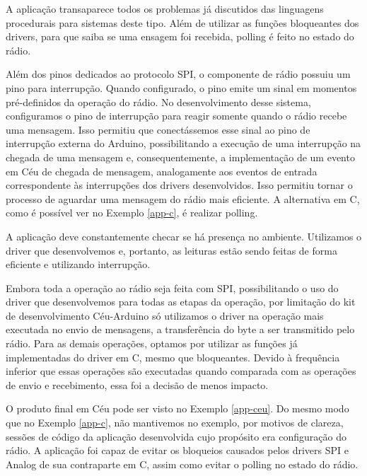\documentclass[11pt]{article}
\begin{document}
\par A aplicação transaparece todos os problemas já discutidos das linguagens procedurais para sistemas deste tipo. Além de utilizar as funções bloqueantes dos drivers, para que saiba se uma ensagem foi recebida, polling é feito no estado do rádio.
\par Além dos pinos dedicados ao protocolo SPI, o componente de rádio possuiu um pino para interrupção. Quando configurado, o pino emite um sinal em momentos pré-definidos da operação do rádio. No desenvolvimento desse sistema, configuramos o pino de interrupção para reagir somente quando o rádio recebe uma mensagem. Isso permitiu que conectássemos esse sinal ao pino de interrupção externa do Arduino, possibilitando a execução de uma interrupção na chegada de uma mensagem e, consequentemente, a implementação de um evento em Céu de chegada de mensagem, analogamente aos eventos de entrada correspondente às interrupções dos drivers desenvolvidos. Isso permitiu tornar o processo de aguardar uma mensagem do rádio mais eficiente. A alternativa em C, como é possível ver no Exemplo \ref{app-c}, é realizar polling.
\par A aplicação deve constantemente checar se há presença no ambiente. Utilizamos o driver que desenvolvemos e, portanto, as leituras estão sendo feitas de forma eficiente e utilizando interrupção.
\par Embora toda a operação ao rádio seja feita com SPI, possibilitando o uso do driver que desenvolvemos para todas as etapas da operação, por limitação do kit de desenvolvimento Céu-Arduino só utilizamos o driver na operação mais executada no envio de mensagens, a transferência do byte a ser transmitido pelo rádio. Para as demais operações, optamos por utilizar as funções já implementadas do driver em C, mesmo que bloqueantes. Devido à frequência inferior que essas operações são executadas quando comparada com as operações de envio e recebimento, essa foi a decisão de menos impacto. 
\par O produto final em Céu pode ser visto no Exemplo \ref{app-ceu}. Do mesmo modo que no Exemplo \ref{app-c}, não mantivemos no exemplo, por motivos de clareza, sessões de código da aplicação desenvolvida cujo propósito era configuração do rádio. A aplicação foi capaz de evitar os bloqueios causados pelos drivers SPI e Analog de sua contraparte em C, assim como evitar o polling no estado do rádio.
\end{document}
